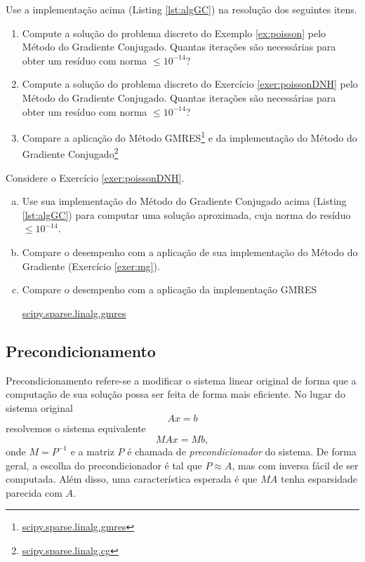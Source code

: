 \begin{exer}\label{exer:mgc}
  Use a implementação acima (Listing \ref{lst:algGC}) na resolução dos seguintes itens.
  \begin{enumerate}
  \item Compute a solução do problema discreto do Exemplo \ref{ex:poisson} pelo Método do Gradiente Conjugado. Quantas iterações são necessárias para obter um resíduo com norma $\leq 10^{-14}$?
  \item Compute a solução do problema discreto do Exercício \ref{exer:poissonDNH} pelo Método do Gradiente Conjugado. Quantas iterações são necessárias para obter um resíduo com norma $\leq 10^{-14}$?
  \item Compare a aplicação do Método GMRES\footnote{\href{https://docs.scipy.org/doc/scipy/reference/generated/scipy.sparse.linalg.gmres.html}{scipy.sparse.linalg.gmres}} e da implementação {\scipy} do Método do Gradiente Conjugado\footnote{\href{https://docs.scipy.org/doc/scipy/reference/generated/scipy.sparse.linalg.cg.html}{scipy.sparse.linalg.cg}}
  \end{enumerate}
\end{exer}

\begin{exer}
  Considere o Exercício \ref{exer:poissonDNH}.
  \begin{enumerate}[a)]
  \item Use sua implementação do Método do Gradiente Conjugado acima (Listing \ref{lst:algGC}) para computar uma solução aproximada, cuja norma do resíduo $\leq 10^{-14}$.
  \item Compare o desempenho com a aplicação de sua implementação do Método do Gradiente (Exercício \ref{exer:mg}).
  \item Compare o desempenho com a aplicação da implementação GMRES
    \begin{center}
      \href{https://docs.scipy.org/doc/scipy/reference/generated/scipy.sparse.linalg.gmres.html}{scipy.sparse.linalg.gmres}
    \end{center}
  \end{enumerate}
\end{exer}

\subsection{Precondicionamento}

Precondicionamento refere-se a modificar o sistema linear original de forma que a computação de sua solução possa ser feita de forma mais eficiente. No lugar do sistema original
\begin{equation}
  Ax = b
\end{equation}
resolvemos o sistema equivalente
\begin{equation}
  MAx = Mb,
\end{equation}
onde $M = P^{-1}$ e a matriz $P$ é chamada de \emph{precondicionador} do sistema. De forma geral, a escolha do precondicionador é tal que $P \approx A$, mas com inversa fácil de ser computada. Além disso, uma característica esperada é que $MA$ tenha esparsidade parecida com $A$.


